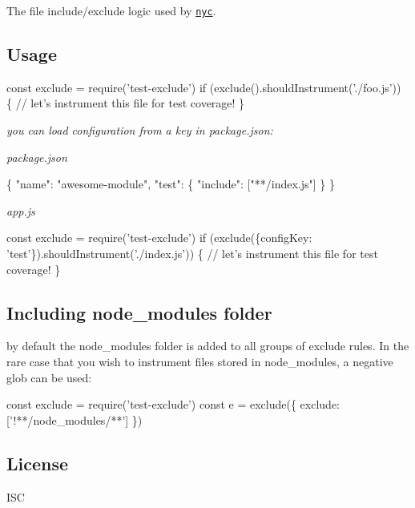 The file include/exclude logic used by \href{https://github.com/istanbuljs/nyc}{\tt nyc}.

\href{https://travis-ci.org/istanbuljs/test-exclude}{\tt } \href{https://coveralls.io/github/istanbuljs/test-exclude?branch=master}{\tt } \href{https://github.com/conventional-changelog/standard-version}{\tt } \href{https://greenkeeper.io/}{\tt }

\subsection*{Usage}


\begin{DoxyCode}
const exclude = require('test-exclude')
if (exclude().shouldInstrument('./foo.js')) \{
  // let's instrument this file for test coverage!
\}
\end{DoxyCode}


{\itshape you can load configuration from a key in package.\+json\+:}

{\itshape package.\+json}


\begin{DoxyCode}
\{
  "name": "awesome-module",
  "test": \{
    "include": ["**/index.js"]
  \}
\}
\end{DoxyCode}


{\itshape app.\+js}


\begin{DoxyCode}
const exclude = require('test-exclude')
if (exclude(\{configKey: 'test'\}).shouldInstrument('./index.js')) \{
  // let's instrument this file for test coverage!
\}
\end{DoxyCode}


\subsection*{Including node\+\_\+modules folder}

by default the {\ttfamily node\+\_\+modules} folder is added to all groups of exclude rules. In the rare case that you wish to instrument files stored in {\ttfamily node\+\_\+modules}, a negative glob can be used\+:


\begin{DoxyCode}
const exclude = require('test-exclude')
const e = exclude(\{
  exclude: ['!**/node\_modules/**']
\})
\end{DoxyCode}


\subsection*{License}

I\+SC 